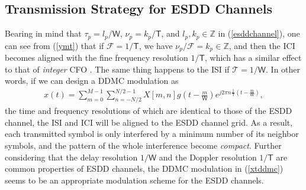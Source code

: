 \documentclass[journal]{IEEEtran}
\begin{document}
\subsection{Transmission Strategy for ESDD Channels}
Bearing in mind that $\tau_p=l_p/\mathsf W$, $\nu_p=k_p/\mathsf T$, and $l_p, k_p \in \mathbb Z$ in (\ref{esddchannel}),  one can see from (\ref{ymt}) that if $\mathcal F=1/\mathsf T$, we have $\nu_p/\mathcal F =k_p\in \mathbb Z$, and then the ICI becomes aligned with the fine frequency resolution $1/\mathsf T$, which has a similar effect to that of  
\emph{integer} CFO \cite{moose94}. The same thing happens to the ISI if $\mathcal T=1/\mathsf W$.
In other words, if we can design a DDMC modulation as
\begin{align}\label{xtddmc}
  x(t)=\sum_{m=0}^{M-1}\sum_{n=-N/2}^{N/2-1} X[m,n]g\left(t-\frac{m}{\mathsf W}\right)e^{j2\pi n \frac{1}{\mathsf T} (t-\frac{m}{\mathsf W})},
\end{align}
the time and frequency resolutions of which are identical to those of the ESDD channel,
the ISI and ICI will be aligned to the ESDD channel grid. {As a result, each transmitted symbol is only interfered by a minimum number of its neighbor symbols, and the pattern of the whole interference become \emph{compact}.}
Further considering that the delay resolution $1/\mathsf W$ and the Doppler resolution $1/\mathsf T$ are common properties of ESDD channels, the DDMC modulation in (\ref{xtddmc}) seems to be an appropriate modulation scheme for the ESDD channels.
\end{document}
